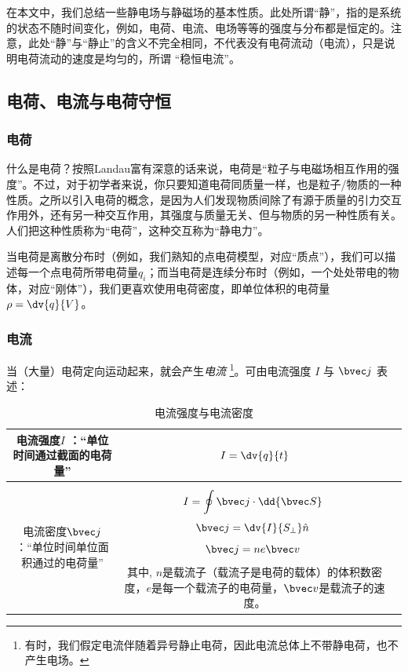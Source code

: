 

在本文中，我们总结一些静电场与静磁场的基本性质。此处所谓“静”，指的是系统的状态不随时间变化，例如，电荷、电流、电场等等的强度与分布都是恒定的。注意，此处“静”与“静止”的含义不完全相同，不代表没有电荷流动（电流），只是说明电荷流动的速度是均匀的，所谓 “稳恒电流”。

\subsection{电荷、电流与电荷守恒}
\subsubsection{电荷}
什么是电荷？按照Landau富有深意的话来说，电荷是“粒子与电磁场相互作用的强度”。不过，对于初学者来说，你只要知道电荷同质量一样，也是粒子/物质的一种性质。之所以引入电荷的概念，是因为人们发现物质间除了有源于质量的引力交互作用外，还有另一种交互作用，其强度与质量无关、但与物质的另一种性质有关。人们把这种性质称为“电荷”，这种交互称为“静电力”。

当电荷是离散分布时（例如，我们熟知的点电荷模型，对应“质点”），我们可以描述每一个点电荷所带电荷量$q_i$；而当电荷是连续分布时（例如，一个处处带电的物体，对应“刚体”），我们更喜欢使用电荷密度，即单位体积的电荷量$\rho = \dv{q}{V}$。

\subsubsection{电流}
当（大量）电荷定向运动起来，就会产生\textsl{电流} \footnote{有时，我们假定电流伴随着异号静止电荷，因此电流总体上不带静电荷，也不产生电场。}。可由电流强度 $I$ 与 $\bvec j$ 表述：

\begin{table}[ht]
\centering
\caption{电流强度与电流密度}\label{tab_estfid3}
\begin{tabular}{|c|c|c|}
\hline
电流强度$I$ ：“单位时间通过截面的电荷量” & $I = \dv{q}{t}$ \\
\hline
电流密度$\bvec j$ ：“单位时间单位面积通过的电荷量” & $$I = \oint \bvec j \cdot \dd {\bvec S}~$$ $$\bvec j= \dv{I}{S_\perp} \hat n~$$ $$\bvec j = n e \bvec v~$$其中, $n$是载流子（载流子是电荷的载体）的体积数密度，$e$是每一个载流子的电荷量，$\bvec v$是载流子的速度。 \\
\hline
\end{tabular}
\end{table}


